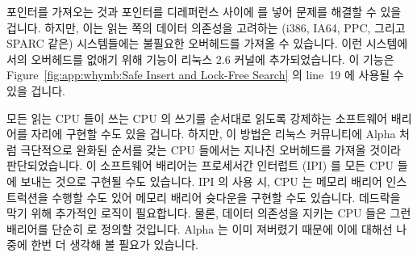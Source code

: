 포인터를 가져오는 것과 포인터를 디레퍼런스 사이에  를 넣어
문제를 해결할 수 있을 겁니다.
하지만, 이는 읽는 쪽의 데이터 의존성을 고려하는 (i386, IA64, PPC, 그리고 SPARC
같은) 시스템들에는 불필요한 오버헤드를 가져올 수 있습니다.
이런 시스템에서의 오버헤드를 없애기 위해 
기능이 리눅스 2.6 커널에 추가되었습니다.
이 기능은  Figure~\ref{fig:app:whymb:Safe Insert and Lock-Free Search} 의
line~19 에 사용될 수 있을 겁니다.

모든 읽는 CPU 들이 쓰는 CPU 의 쓰기를 순서대로 읽도록 강제하는 소프트웨어
배리어를  자리에 구현할 수도 있을 겁니다.
하지만, 이 방법은 리눅스 커뮤니티에 Alpha 처럼 극단적으로 완화된 순서를 갖는
CPU 들에서는 지나친 오버헤드를 가져올 것이라 판단되었습니다.
이 소프트웨어 배리어는 프로세서간 인터럽트 (IPI) 를 모든 CPU 들에 보내는 것으로
구현될 수도 있습니다.
IPI 의 사용 시, CPU 는 메모리 배리어 인스트럭션을 수행할 수도 있어 메모리
배리어 슛다운을 구현할 수도 있습니다.
데드락을 막기 위해 추가적인 로직이 필요합니다.
물론, 데이터 의존성을 지키는 CPU 들은 그런 배리어를 단순히  로
정의할 것입니다.
Alpha 는 이미 져버렸기 때문에 이에 대해선 나중에 한번 더 생각해 볼 필요가
있습니다.

